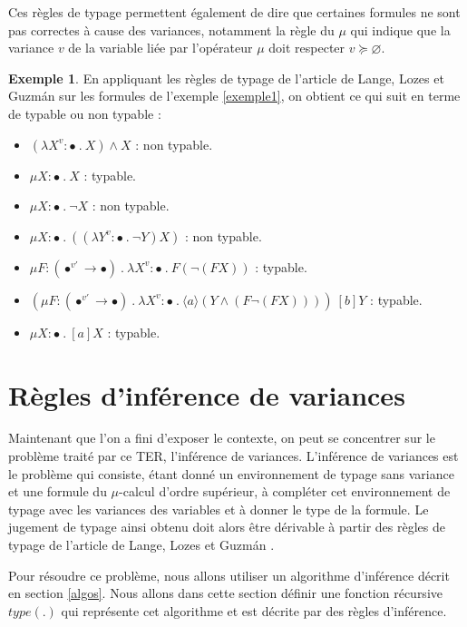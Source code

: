 \documentclass{rapport}
\theoremstyle{plain}
\theoremstyle{remark}
\theoremstyle{definition}
\newtheorem{exem}{Exemple}
\begin{document}
Ces règles de typage permettent également de dire que certaines formules ne sont pas correctes à cause des variances, notamment la règle du $\mu$ qui indique que la variance $v$ de la variable liée par l'opérateur $\mu$ doit respecter $v \succcurlyeq \varnothing$.

\begin{exem}\label{exemple2}
En appliquant les règles de typage de l'article de Lange, Lozes et Guzm{\'a}n \citep{lange2014model} sur les formules de l'exemple \ref{exemple1}, on obtient ce qui suit en terme de typable ou non typable :
\begin{itemize}
	\item $(\lambda X^{v} : \bullet \ . \ X) \wedge X$ : non typable. 
	\item $\mu X : \bullet \ . \  X$ : typable.
	\item $\mu X : \bullet \ . \  \neg X$ : non typable.
	\item $\mu X : \bullet \ . \  ((\lambda Y^{v} : \bullet \ . \ \neg Y)X)$ : non typable.
	\item $\mu F : (\bullet^{v'} \rightarrow \bullet) \ . \  \lambda X^{v} : \bullet \ . \ F (\neg (F X))$ : typable.
	\item $(\mu F : (\bullet^{v'} \rightarrow \bullet) \ . \ \lambda X^{v} : \bullet \ . \ \langle a \rangle (Y \wedge (F \neg(F X)))) \ [b] Y$ : typable.
	\item $\mu X : \bullet \ . \ [a]X$ : typable.
\end{itemize}
\end{exem}

\section{Règles d'inférence de variances\label{regles}}

Maintenant que l'on a fini d'exposer le contexte, on peut se concentrer sur le problème traité par ce TER, l'inférence de variances. L'inférence de variances est le problème qui consiste, étant donné un environnement de typage sans variance et une formule du $\mu$-calcul d'ordre supérieur, à compléter cet environnement de typage avec les variances des variables et à donner le type de la formule. Le jugement de typage ainsi obtenu doit alors être dérivable à partir des règles de typage de l'article de Lange, Lozes et Guzm{\'a}n \citep{lange2014model}.

Pour résoudre ce problème, nous allons utiliser un algorithme d'inférence décrit en section \ref{algos}. Nous allons dans cette section définir une fonction récursive $type(.)$ qui représente cet algorithme et est décrite par des règles d'inférence. 
\end{document}
